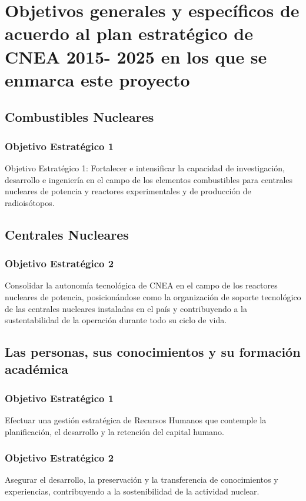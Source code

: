 \section{
Objetivos generales y específicos de acuerdo al plan estratégico de CNEA 2015-
2025 en los que se enmarca este proyecto
}

\subsection{Combustibles Nucleares}

\subsubsection{Objetivo Estratégico 1}
Objetivo Estratégico 1: Fortalecer e intensificar la capacidad de investigación,
desarrollo e ingeniería en el campo de los elementos combustibles para
centrales nucleares de potencia y reactores experimentales y de producción
de radioisótopos. 


\subsection{Centrales Nucleares}

\subsubsection{Objetivo Estratégico 2}
Consolidar la autonomía tecnológica de CNEA en
el campo de los reactores nucleares de potencia, posicionándose como la
organización de soporte tecnológico de las centrales nucleares instaladas
en el país y contribuyendo a la sustentabilidad de la operación durante todo
su ciclo de vida.


\subsection{
Las personas, sus conocimientos y su
formación académica
}

\subsubsection{Objetivo Estratégico 1}
Efectuar una gestión estratégica de Recursos
Humanos que contemple la planificación, el desarrollo y la retención del
capital humano.

\subsubsection{Objetivo Estratégico 2}
Asegurar el desarrollo, la preservación y la
transferencia de conocimientos y experiencias, contribuyendo a la
sostenibilidad de la actividad nuclear.

